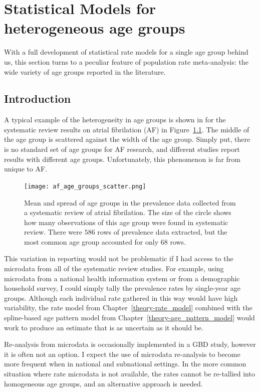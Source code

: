 \chapter{Statistical Models for heterogeneous age groups}
With a full development of statistical rate models for a single age
group behind us, this section turns to a peculiar feature of
population rate meta-analysis: the wide variety of age groups reported
in the literature.

\section{Introduction}
A typical example of the heterogeneity in age groups is shown in for
the systematic review results on atrial fibrilation (AF) in
Figure~\ref{age-group-model-af-age-groups}.  The middle of the age
group is scattered against the width of the age group.  Simply put,
there is no standard set of age groups for AF research, and different
studies report results with different age groups. Unfortunately, this
phenomenon is far from unique to AF.

\begin{figure}[h]
\begin{center}
\texttt{[image: af\_age\_groups\_scatter.png]}
\end{center}
\caption{Mean and spread of age groups in the prevalence data
  collected from a systematic review of atrial fibrilation. The
  size of the circle shows how many observations of this age group
  were found in systematic review. There were
  $586$ rows of prevalence data
  extracted, but the most common age group accounted for only
  $68$ rows.}
\label{age-group-model-af-age-groups}
\end{figure}

This variation in reporting would not be problematic if I had access
to the microdata from all of the systematic review studies.  For
example, using microdata from a national health information system or
from a demographic household survey, I could simply tally the
prevalence rates by single-year age groups.  Although each individual
rate gathered in this way would have high variability, the rate model
from Chapter~\ref{theory-rate_model} combined with the spline-based
age pattern model from Chapter~\ref{theory-age_pattern_model} would
work to produce an estimate that is as uncertain as it should be.

Re-analysis from microdata is occasionally implemented in a GBD study,
however it is often not an option.  I expect the use of microdata
re-analysis to become more frequent when in national and subnational
settings.  In the more common situation where rate microdata is not
available, the rates cannot be re-tallied into homogeneous age groups,
and an alternative approach is needed.

